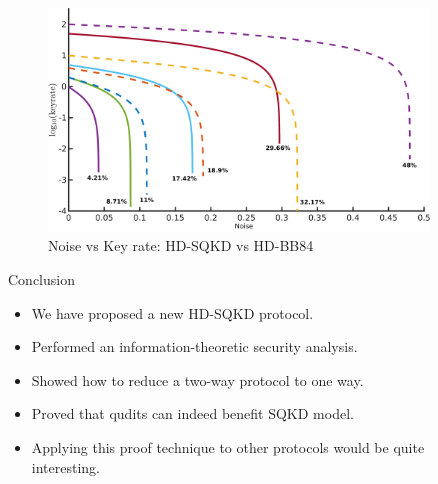 \documentclass[final]{beamer}
\newlength{\sepwid}
\newlength{\onecolwid}
\newlength{\twocolwid}
\begin{document}
\begin{frame}[t]
\begin{columns}[t]
\begin{column}{\twocolwid}
\begin{columns}[t,totalwidth=\twocolwid]
\end{columns} %

\end{column} %

\begin{column}{\sepwid}\end{column} %

\begin{column}{\onecolwid} %


\begin{figure}
	\includegraphics[width=\linewidth]{q_v_kr_to_label_done_small.png}
	\caption{Noise vs Key rate: HD-SQKD vs HD-BB84}
\end{figure}

\begin{block}{Conclusion}

\begin{itemize}
	\item We have proposed a new HD-SQKD protocol.
	\item Performed an information-theoretic security analysis. 
	\item Showed how to reduce a two-way protocol to one way. 
	\item Proved that qudits can indeed benefit SQKD model. 
	\item Applying this proof technique to other protocols would be quite interesting. 
\end{itemize}

\end{block}


\end{column}
\end{columns}
\end{frame}
\end{document}
